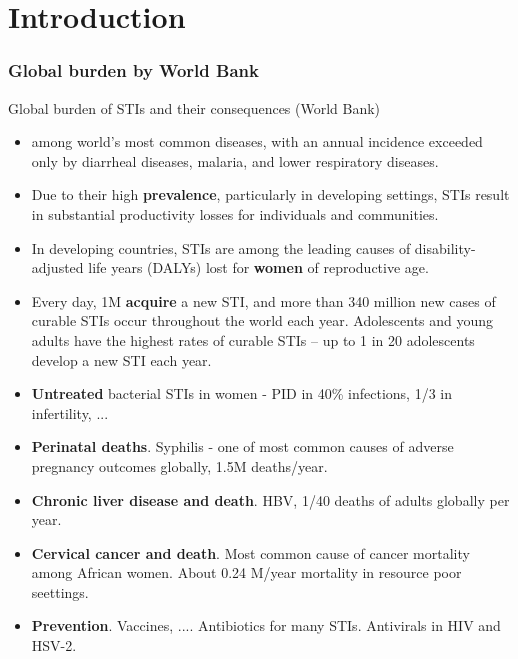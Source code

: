 \documentclass{beamer}
\begin{document}
\section{Introduction}
\begin{frame}[shrink]
\frametitle{Global burden by World Bank}
Global burden of STIs and their consequences (World Bank)
\begin{itemize}
\item among world’s most common diseases, with an annual incidence exceeded only by diarrheal diseases, malaria, and lower respiratory diseases. 
\item Due to their high \textbf{prevalence}, particularly in developing settings, STIs result in substantial productivity losses for individuals and communities. %
\item In developing countries, STIs are among the leading causes of disability-adjusted life years (DALYs) lost for \textbf{women} of reproductive age. 
\item Every day, 1M \textbf{acquire} a new STI, and more than 340 million new cases of curable STIs occur throughout the world each year. 
Adolescents and young adults have the highest rates of curable STIs -- up to 1 in 20 adolescents develop a new STI each year. 
\item \textbf{Untreated} bacterial STIs in women - PID in 40\% infections, 1/3 in infertility, ...
\item \textbf{Perinatal deaths}. Syphilis - one of most common causes of adverse pregnancy outcomes globally, 1.5M deaths/year. 
\item \textbf{Chronic liver disease and death}. HBV, 1/40 deaths of adults globally per year. 
\item \textbf{Cervical cancer and death}. Most common cause of cancer mortality among African women. About 0.24 M/year mortality in resource poor seettings. 
\item \textbf{Prevention}. Vaccines, .... Antibiotics for many STIs. Antivirals in HIV and HSV-2.  
\end{itemize}
\end{frame}
\end{document}
